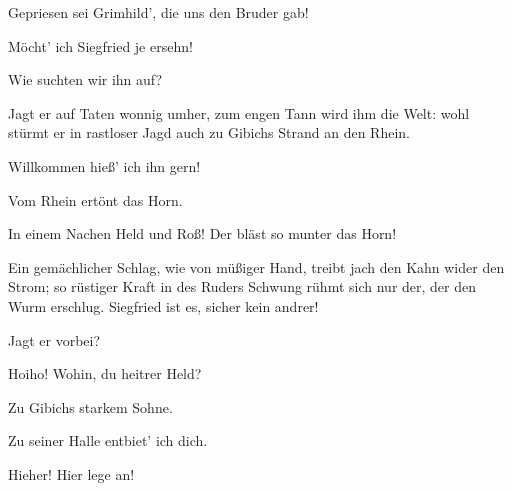 \begin{drama}

Gepriesen sei Grimhild',
die uns den Bruder gab!
 

\Gutrunespeaks

Möcht' ich Siegfried je ersehn!
 

\Guntherspeaks

Wie suchten wir ihn auf?
 




\Hagenspeaks

Jagt er auf Taten wonnig umher,
zum engen Tann wird ihm die Welt:
wohl stürmt er in rastloser Jagd
auch zu Gibichs Strand an den Rhein.
 

\Guntherspeaks

Willkommen hieß' ich ihn gern!


Vom Rhein ertönt das Horn.
 

\Hagenspeaks



In einem Nachen Held und Roß!
Der bläst so munter das Horn!


Ein gemächlicher Schlag,
wie von müßiger Hand,
treibt jach den Kahn wider den Strom;
so rüstiger Kraft in des Ruders Schwung
rühmt sich nur der, der den Wurm erschlug.
Siegfried ist es, sicher kein andrer!
 

\Guntherspeaks

Jagt er vorbei?
 

\Hagenspeaks



Hoiho! Wohin,
du heitrer Held?
 



Zu Gibichs starkem Sohne.
 

\Hagenspeaks

Zu seiner Halle entbiet' ich dich.
 



Hieher! Hier lege an!


\end{drama}
